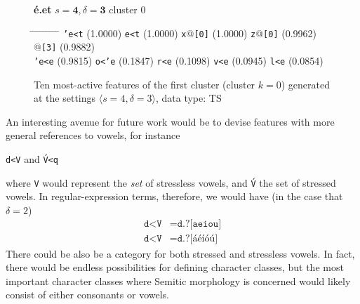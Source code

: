 \begin{figure}[t] 
\begin{mdframed}
{\LARGE\textbf{\'{e}.et}} \large{\hfill $s=\textbf{4},\delta=\textbf{3}$} \hfill cluster 0
\vspace{3pt}
\begin{small}
\begin{tabbing}
\hspace{6ex} \= \hspace{12ex} \= \hspace{6ex} \= \hspace{13ex} \= \hspace{7ex} \= \hspace{13ex} \= \hspace{7ex} \= \hspace{13ex} \= \hspace{7ex} \= \hspace{9ex} \kill
\texttt{\a'{e}<t} \> (1.0000) \> \texttt{e<t} \> (1.0000) \> \texttt{x}@\texttt{[0]} \> (1.0000) \> \texttt{z}@\texttt{[0]} \> (0.9962) \> \texttt{}@\texttt{[3]} \> (0.9882) \\
 \texttt{\a'{e}<e} \> (0.9815) \> \texttt{o<\a'{e}} \> (0.1847) \> \texttt{r<e} \> (0.1098) \> \texttt{v<e} \> (0.0945) \> \texttt{l<e} \> (0.0854)
\end{tabbing}
\end{small}
\caption{Ten most-active features of the first cluster (cluster $k = 0$) generated at the settings $\langle{s}=4,\delta=3\rangle$, data type: TS}
\label{fig:cluster-0-4-3-TS}
\end{mdframed}
\end{figure}


An interesting avenue for future work would be to devise features with more general references to vowels, for instance 
\begin{center}\texttt{d<V} and \texttt{\'{V}<q}\end{center}
 where 
 \texttt{V} would represent the \emph{set} of stressless vowels, and \texttt{\'{V}} the set of stressed vowels. In regular-expression terms, therefore, we would have (in the case that $\delta = 2$)
 \begin{align}
 \texttt{d<V} &= \texttt{d.?[aeiou]} \\
  \texttt{d<\'{V}} &= \texttt{d.?[\'{a}\'{e}\'{i}\'{o}\'{u}]}
 \end{align}
 There could be also be a category for both stressed and stressless vowels. In fact, there would be endless possibilities for defining character classes, but the most important character classes where Semitic morphology is concerned would likely consist of either consonants or vowels. 
 
